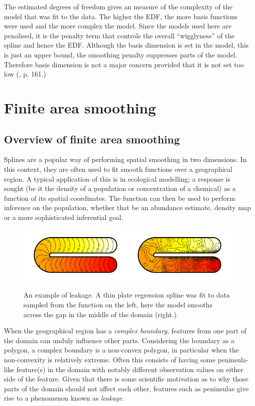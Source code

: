 The estimated degrees of freedom gives an measure of the complexity of the model that was fit to the data. The higher the EDF, the more basis functions were used and  the more complex the model.  Since the models used here are penalised, it is the penalty term that controls the overall ``wigglyness'' of the spline and hence the EDF. Although the basis dimension is set in the model, this is just an upper bound, the smoothing penalty suppresses parts of the model. Therefore basis dimension is not a major concern provided that it is not set too low (\cite{simonbook}, p. 161.) 

	\ei
\ei

\section{Finite area smoothing}

\subsection{Overview of finite area smoothing}

Splines are a popular way of performing spatial smoothing in two dimensions. In this context, they are often used to fit smooth functions over a geographical region. A typical application of this is in ecological modelling; a response is sought (be it the density of a population or concentration of a chemical) as a function of its spatial coordinates. The function can then be used to perform inference on the population, whether that be an abundance estimate, density map or a more sophisticated inferential goal.

\begin{figure}
\centering
\includegraphics{intro/figs/ramsay-leak.pdf}\\
\caption{An example of leakage. A thin plate regression spline was fit to data sampled from the function on the left, here the model smooths across the gap in the middle of the domain (right.)}
\label{leakage}
\end{figure}

When the geographical region has a \emph{complex boundary}, features from one part of the domain can unduly influence other parts. Considering the boundary as a polygon, a complex boundary is a non-convex polygon, in particular when the non-convexity is relatively extreme. Often this consists of having some peninsula-like feature(s) in the domain with notably different observation values on either side of the feature. Given that there is some scientific motivation as to why those parts of the domain should not affect each other, features such as peninsulae give rise to a phenomenon known as \emph{leakage}.

